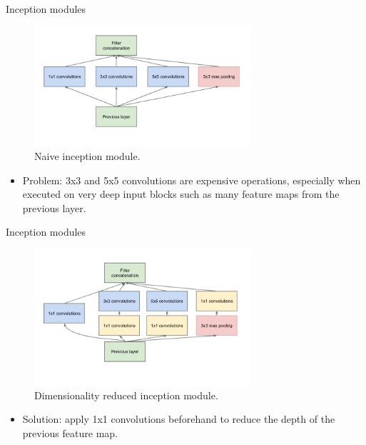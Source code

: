 
\begin{vbframe}{Inception modules}
  \begin{figure}
    \centering
    \includegraphics[width=8cm]{plots/05_conv_variations/inception/incept_naive.png}
    \caption{Naive inception module.}
  \end{figure}
    \begin{itemize}
        \item Problem: 3x3 and 5x5 convolutions are expensive operations, especially when executed on very deep input blocks such as many feature maps from the previous layer.
    \end{itemize}
\end{vbframe}


\begin{vbframe}{Inception modules}
  \begin{figure}
    \centering
    \includegraphics[width=8cm]{plots/05_conv_variations/inception/incept_dim_reduction.png}
    \caption{Dimensionality reduced inception module.}
  \end{figure}
    \begin{itemize}
        \item Solution: apply 1x1 convolutions beforehand to reduce the depth of the previous feature map.
    \end{itemize}
\end{vbframe}

